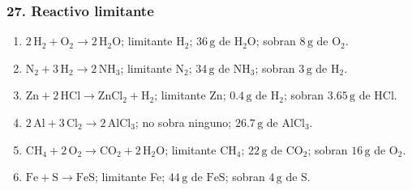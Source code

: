 \subsubsection*{27. Reactivo limitante}
\begin{enumerate}
    \item[a)] $2\,\mathrm{H_2}+\mathrm{O_2}\rightarrow2\,\mathrm{H_2O}$;
    limitante $\mathrm{H_2}$;
    $36\,\mathrm{g}$ de $\mathrm{H_2O}$;
    sobran $8\,\mathrm{g}$ de $\mathrm{O_2}$.

    \item[b)] $\mathrm{N_2}+3\,\mathrm{H_2}\rightarrow2\,\mathrm{NH_3}$;
    limitante $\mathrm{N_2}$;
    $34\,\mathrm{g}$ de $\mathrm{NH_3}$;
    sobran $3\,\mathrm{g}$ de $\mathrm{H_2}$.

    \item[c)] $\mathrm{Zn}+2\,\mathrm{HCl}\rightarrow
    \mathrm{ZnCl_2}+\mathrm{H_2}$;
    limitante Zn;
    $0.4\,\mathrm{g}$ de $\mathrm{H_2}$;
    sobran $3.65\,\mathrm{g}$ de $\mathrm{HCl}$.

    \item[d)] $2\,\mathrm{Al}+3\,\mathrm{Cl_2}\rightarrow2\,\mathrm{AlCl_3}$;
    no sobra ninguno;
    $26.7\,\mathrm{g}$ de $\mathrm{AlCl_3}$.

    \item[e)] $\mathrm{CH_4}+2\,\mathrm{O_2}\rightarrow
    \mathrm{CO_2}+2\,\mathrm{H_2O}$;
    limitante $\mathrm{CH_4}$;
    $22\,\mathrm{g}$ de $\mathrm{CO_2}$;
    sobran $16\,\mathrm{g}$ de $\mathrm{O_2}$.

    \item[f)] $\mathrm{Fe}+\mathrm{S}\rightarrow\mathrm{FeS}$;
    limitante Fe;
    $44\,\mathrm{g}$ de $\mathrm{FeS}$;
    sobran $4\,\mathrm{g}$ de S.
\end{enumerate}

